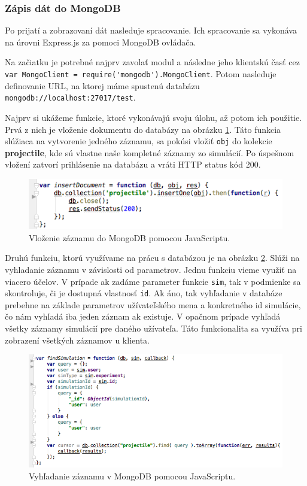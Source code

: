 \subsubsection{Zápis dát do MongoDB}
Po prijatí a zobrazovaní dát nasleduje spracovanie. Ich spracovanie sa vykonáva na úrovni Express.js za pomoci MongoDB ovládača.

Na začiatku je potrebné najprv zavolať modul a následne jeho klientskú časť cez \verb|var MongoClient = require('mongodb').MongoClient|. Potom nasleduje definovanie URL, na ktorej máme spustenú databázu \verb|mongodb://localhost:27017/test|.

Najprv si ukážeme funkcie, ktoré vykonávajú svoju úlohu, až potom ich použitie. Prvá z nich je vloženie dokumentu do databázy na obrázku \ref{img-express-mongo-insert}. Táto funkcia slúžiaca na vytvorenie jedného záznamu, sa pokúsi vložiť \verb|obj| do kolekcie \textbf{projectile}, kde sú vlastne naše kompletné záznamy zo simulácií. Po úspešnom vložení zatvorí prihlásenie na databázu a vráti HTTP status kód 200.

\begin{figure}[H]
  \centering
  \includegraphics[scale=0.7]{img/code/express-mongo-insert.png}
  \caption{Vloženie záznamu do MongoDB pomocou JavaScriptu.}
  \label{img-express-mongo-insert}
\end{figure}

Druhú funkciu, ktorú využívame na prácu s databázou je na obrázku \ref{img-express-mongodb-find}. 
Slúži na vyhladanie záznamu v závislosti od parametrov. Jednu funkciu vieme využiť na viacero účelov. V prípade ak zadáme parameter funkcie \verb|sim|, tak v podmienke sa skontroluje, či je dostupná vlastnosť \verb|id|. Ak áno, tak vyhľadanie v databáze prebehne na základe parametrov užívateľského mena a konkretného id simulácie, čo nám vyhľadá iba jeden záznam ak existuje. V opačnom prípade vyhľadá všetky záznamy simulácií pre daného užívateľa. Táto funkcionalita sa využíva pri zobrazení všetkých záznamov u klienta.

\begin{figure}[H]
  \centering
  \includegraphics[scale=0.65]{img/code/express-mongodb-find.png}
  \caption{Vyhľadanie záznamu v MongoDB pomocou JavaScriptu.}
  \label{img-express-mongodb-find}
\end{figure}

